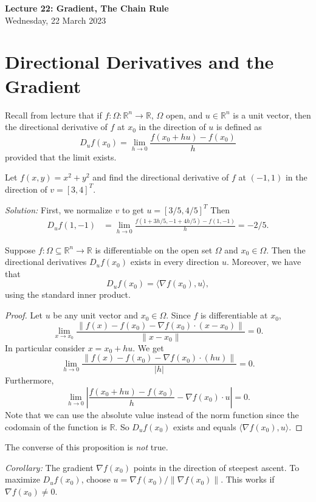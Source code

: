\documentclass[11pt]{article}
\theoremstyle{definition}
\newcommand{\R}{\mathbb{R}}                      %
\begin{document}
\thispagestyle{empty}

\begin{center}
{\LARGE \bf Lecture 22: Gradient, The Chain Rule}\\
{\large Wednesday, 22 March 2023}\\
\end{center}

\section{Directional Derivatives and the Gradient}
Recall from lecture that if $f:\Omega:\R^n\to \R$, $\Omega$ open, and $u\in\R^n$ is a unit vector, then the directional derivative of $f$ at $x_0$ in the direction of $u$ is defined as
$$
D_uf(x_0)=\lim_{h\to 0} \frac{f(x_0+hu)-f(x_0)}{h}
$$
provided that the limit exists.

\ex Let $f(x,y)=x^2+y^2$ and find the directional derivative of $f$ at $(-1,1)$ in the direction of $v=[3,4]^T$.

\textit{Solution:} First, we normalize $v$ to get $u=[3/5,4/5]^T$ Then
\begin{align*}
    D_uf(1,-1)&=\lim_{h\to 0} \frac{f(1+3h/5,-1+4h/5)-f(1,-1)}{h}=-2/5.
\end{align*}

\prop Suppose $f:\Omega\subseteq \R^n\to \R$ is differentiable on the open set $\Omega$ and $x_0\in \Omega$. Then the directional derivatives $D_uf(x_0)$ exists in every direction $u$. Moreover, we have that
$$
D_uf(x_0)=\langle \nabla f(x_0), u\rangle,
$$
using the standard inner product.

\begin{proof}
    Let $u$ be any unit vector and $x_0\in\Omega$. Since $f$ is differentiable at $x_0$, 
    $$
    \lim_{x\to x_0}\frac{\|f(x)-f(x_0)-\nabla f(x_0)\cdot(x-x_0)\|}{\|x-x_0\|}=0.
    $$
    In particular consider $x=x_0+hu$. We get 
    $$
    \lim_{h\to 0} \frac{\|f(x)-f(x_0)-\nabla f(x_0)\cdot (hu)\|}{|h|}=0.
    $$
    Furthermore,
    $$
    \lim_{h\to 0}\left|\frac{f(x_0+hu)-f(x_0)}{h}-\nabla f(x_0)\cdot u\right|=0.
    $$
    Note that we can use the absolute value instead of the norm function since the codomain of the function is $\R$. So $D_uf(x_0)$ exists and equals $\langle \nabla f(x_0), u\rangle$.
\end{proof}
\note The converse of this proposition is \textit{not} true.


\textit{Corollary:} The gradient $\nabla f(x_0)$ points in the direction of steepest ascent. To maximize $D_uf(x_0)$, choose $u=\nabla f(x_0)/\|\nabla f(x_0)\|$. This works if $\nabla f(x_0)\neq 0$.
\end{document}
